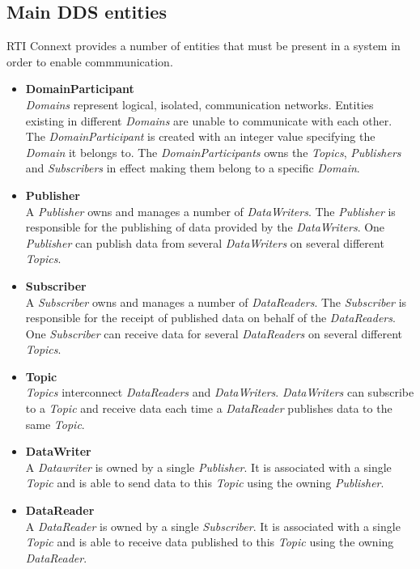 \subsection{Main DDS entities}
RTI Connext provides a number of entities that must be present in a system in order to enable commmunication.

\begin{itemize}
	\item \textbf{DomainParticipant} \\
		\textit{Domains} represent logical, isolated, communication networks. Entities existing in different \textit{Domains} are unable to communicate with each other. The \textit{DomainParticipant} is created with an integer value specifying the \textit{Domain} it belongs to. The \textit{DomainParticipants} owns the \textit{Topics}, \textit{Publishers} and \textit{Subscribers} in effect making them belong to a specific \textit{Domain}.
	
	\item \textbf{Publisher} \\
		A \textit{Publisher} owns and manages a number of \textit{DataWriters}. The \textit{Publisher} is responsible for the publishing of data provided by the \textit{DataWriters}. One \textit{Publisher} can publish data from several \textit{DataWriters} on several different \textit{Topics}.
	
	\item \textbf{Subscriber} \\
		A \textit{Subscriber} owns and manages a number of \textit{DataReaders}. The \textit{Subscriber} is responsible for the receipt of published data on behalf of the \textit{DataReaders}. One \textit{Subscriber} can receive data for several \textit{DataReaders} on several different \textit{Topics}. 
	
	\item \textbf{Topic} \\
		\textit{Topics} interconnect \textit{DataReaders} and \textit{DataWriters}. \textit{DataWriters} can subscribe to a \textit{Topic} and receive data each time a \textit{DataReader} publishes data to the same \textit{Topic}.
	
	\item \textbf{DataWriter} \\
		A \textit{Datawriter} is owned by a single \textit{Publisher}. It is associated with a single \textit{Topic} and is able to send data to this \textit{Topic} using the owning \textit{Publisher}.
	
	\item \textbf{DataReader} \\
		A \textit{DataReader} is owned by a single \textit{Subscriber}. It is associated with a single \textit{Topic} and is able to receive data published to this \textit{Topic} using the owning \textit{DataReader}.
\end{itemize}

